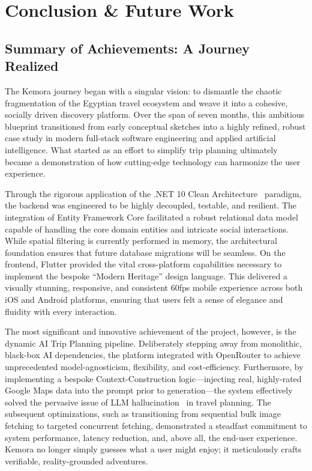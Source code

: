 \chapter{Conclusion \& Future Work}

\section{Summary of Achievements: A Journey Realized}
The Kemora journey began with a singular vision: to dismantle the chaotic fragmentation of the Egyptian travel ecosystem and weave it into a cohesive, socially driven discovery platform. Over the span of seven months, this ambitious blueprint transitioned from early conceptual sketches into a highly refined, robust case study in modern full-stack software engineering and applied artificial intelligence. What started as an effort to simplify trip planning ultimately became a demonstration of how cutting-edge technology can harmonize the user experience.

Through the rigorous application of the .NET 10 Clean Architecture~\cite{martin2017clean} paradigm, the backend was engineered to be highly decoupled, testable, and resilient. The integration of Entity Framework Core facilitated a robust relational data model capable of handling the core domain entities and intricate social interactions. While spatial filtering is currently performed in memory, the architectural foundation ensures that future database migrations will be seamless. On the frontend, Flutter provided the vital cross-platform capabilities necessary to implement the bespoke ``Modern Heritage'' design language. This delivered a visually stunning, responsive, and consistent 60fps mobile experience across both iOS and Android platforms, ensuring that users felt a sense of elegance and fluidity with every interaction.

The most significant and innovative achievement of the project, however, is the dynamic AI Trip Planning pipeline. Deliberately stepping away from monolithic, black-box AI dependencies, the platform integrated with OpenRouter to achieve unprecedented model-agnosticism, flexibility, and cost-efficiency. Furthermore, by implementing a bespoke Context-Construction logic---injecting real, highly-rated Google Maps data into the prompt prior to generation---the system effectively solved the pervasive issue of LLM hallucination~\cite{ji2023survey} in travel planning. The subsequent optimizations, such as transitioning from sequential bulk image fetching to targeted concurrent fetching, demonstrated a steadfast commitment to system performance, latency reduction, and, above all, the end-user experience. Kemora no longer simply guesses what a user might enjoy; it meticulously crafts verifiable, reality-grounded adventures.

